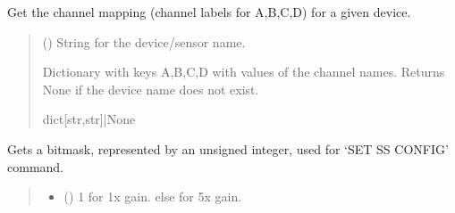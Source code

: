 \documentclass[letterpaper,10pt,english]{sphinxmanual}
\begin{document}
\begin{fulllineitems}

\begin{fulllineitems}
\label{\detokenize{Morelia.Devices:Morelia.Devices.PodDevice_8401HR.Pod8401HR.GetChannelMapForPreampDevice}}
\pysigstartsignatures
{}
\pysigstopsignatures
\sphinxAtStartPar
Get the channel mapping (channel labels for A,B,C,D) for a given device.
\begin{quote}\begin{description}
\sphinxAtStartPar
{} () \textendash{} String for the device/sensor name.

\sphinxAtStartPar
Dictionary with keys A,B,C,D with values of the channel names. Returns                 None if the device name does not exist.

\sphinxAtStartPar
dict{[}str,str{]}|None

\end{description}\end{quote}

\end{fulllineitems}


\begin{fulllineitems}
\label{\detokenize{Morelia.Devices:Morelia.Devices.PodDevice_8401HR.Pod8401HR.GetSSConfigBitmask}}
\pysigstartsignatures
{}
\pysigstopsignatures
\sphinxAtStartPar
Gets a bitmask, represented by an unsigned integer, used for ‘SET SS CONFIG’ command.
\begin{quote}\begin{description}
\begin{itemize}
\item {} 
\sphinxAtStartPar
{} () \textendash{} 1 for 1x gain. else for 5x gain.


\end{itemize}
\end{description}
\end{quote}
\end{fulllineitems}
\end{fulllineitems}
\end{document}

